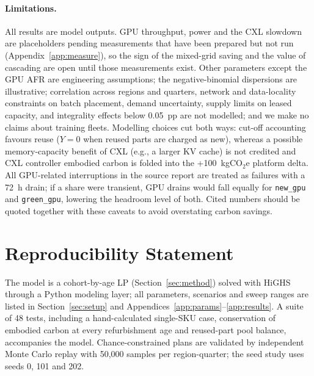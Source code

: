 \documentclass{article} %
\begin{document}
\paragraph{Limitations.} All results are model outputs. GPU throughput, power and the CXL slowdown are placeholders pending measurements that have been prepared but not run (Appendix~\ref{app:measure}), so the sign of the mixed-grid saving and the value of cascading are open until those measurements exist. Other parameters except the GPU AFR are engineering assumptions; the negative-binomial dispersions are illustrative; correlation across regions and quarters, network and data-locality constraints on batch placement, demand uncertainty, supply limits on leased capacity, and integrality effects below 0.05~pp are not modelled; and we make no claims about training fleets. Modelling choices cut both ways: cut-off accounting favours reuse ($Y=0$ when reused parts are charged as new), whereas a possible memory-capacity benefit of CXL (e.g., a larger KV cache) is not credited and CXL controller embodied carbon is folded into the +100~kgCO$_2$e platform delta. All GPU-related interruptions in the source report are treated as failures with a 72~h drain; if a share were transient, GPU drains would fall equally for \texttt{new\_gpu} and \texttt{green\_gpu}, lowering the headroom level of both. Cited numbers should be quoted together with these caveats to avoid overstating carbon savings.

\section*{Reproducibility Statement}
The model is a cohort-by-age LP (Section~\ref{sec:method}) solved with HiGHS through a Python modeling layer; all parameters, scenarios and sweep ranges are listed in Section~\ref{sec:setup} and Appendices~\ref{app:params}--\ref{app:results}. A suite of 48 tests, including a hand-calculated single-SKU case, conservation of embodied carbon at every refurbishment age and reused-part pool balance, accompanies the model. Chance-constrained plans are validated by independent Monte Carlo replay with 50,000 samples per region-quarter; the seed study uses seeds 0, 101 and 202.




\clearpage
\appendix
\end{document}
